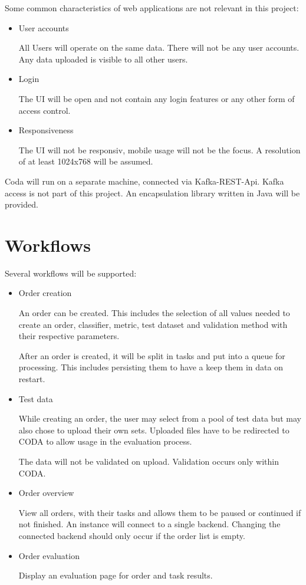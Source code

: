 \documentclass[12pt,a4paper,titlepage,oneside,BCOR1cm]{scrreprt}
\begin{document}
Some common characteristics of web applications are not relevant in this project:
\begin{itemize}
  \item User accounts

  All Users will operate on the same data. There will not be any user accounts. Any data uploaded is visible to all other users.
  \item Login

  The UI will be open and not contain any login features or any other form of access control.

  \item Responsiveness

  The UI will not be responsiv, mobile usage will not be the focus. A resolution of at least 1024x768 will be assumed.
\end{itemize}

Coda will run on a separate machine, connected via Kafka-REST-Api. Kafka access is not part of this project. An encapsulation library written in Java will be provided.

\section{Workflows}

Several workflows will be supported:
\begin{itemize}
  \item Order creation

  An order can be created. This includes the selection of all values needed to create an order, classifier, metric, test dataset and validation method with their respective parameters.

  After an order is created, it will be split in tasks and put into a queue for processing. This includes persisting them to have a keep them in data on restart.

  \item Test data

  While creating an order, the user may select from a pool of test data but may also chose to upload their own sets. Uploaded files have to be redirected to CODA to allow usage in the evaluation process.

  The data will not be validated on upload. Validation occurs only within CODA.

  \item Order overview

  View all orders, with their tasks and allows them to be paused or continued if not finished. An instance will connect to a single backend. Changing the connected backend should only occur if the order list is empty.

  \item Order evaluation
  
  Display an evaluation page for order and task results.
\end{itemize}
\end{document}
